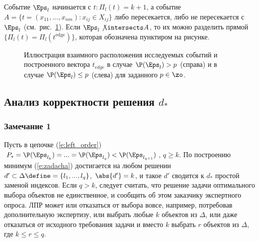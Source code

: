 Событие $\Eps_l$ начинается с $t: \Pi_l(t) = k+1$, а событие $A = \{t = (x_{11}, ..., x_{nm}): x_{ij} \in X_{ij}\}$ либо пересекается, либо не пересекается с $\Eps_l$ (см.~рис.~\ref{ris:algo_sets}). Если $\Eps_l \not\intersects A$, то их можно разделить прямой $\{\Pi_l(t) = \Pi_l(t^\text{edge})\}$, которая обозначена пунктиром на рисунке.

\begin{figure}[h]
\caption{\small Иллюстрация взаимного расположения исследуемых событий и построенного вектора $t_{edge}$ в случае $\P(\Eps_l) > p$ (справа) и в случае $\P(\Eps_l) \leq p$ (слева) для заданного $p \in \zo$.}
\label{ris:algo_sets}
\end{figure}

\subsection{Анализ корректности решения $d_*$}
\subsubsection*{Замечание 1}

Пусть в цепочке (\ref{e:left_order}) $P_* = \P(\Eps_{l_k}) = ... = \P(\Eps_{l_q}) < \P(\Eps_{l_{q+1}})$, $q \geq k$. По построению минимум (\ref{e:zadacha}) достигается на любом решении $d' \subset \Delta \define= \{l_1, ..., l_q\}$, $\abs{d'} = k$, и такое $d'$ сводится к $d_*$ простой заменой индексов. Если $q > k$, следует считать, что решение задачи оптимального выбора объектов не единственное, и сообщить об этом заказчику экспертного опроса. ЛПР может или отказаться от выбора вовсе, например, потребовав дополнительную экспертизу, или выбрать любые $k$ объектов из $\Delta$, или даже отказаться от исходного требования задачи и вместо $k$ выбрать $r$ объектов из $\Delta$, где $k \leq r \leq q$.

